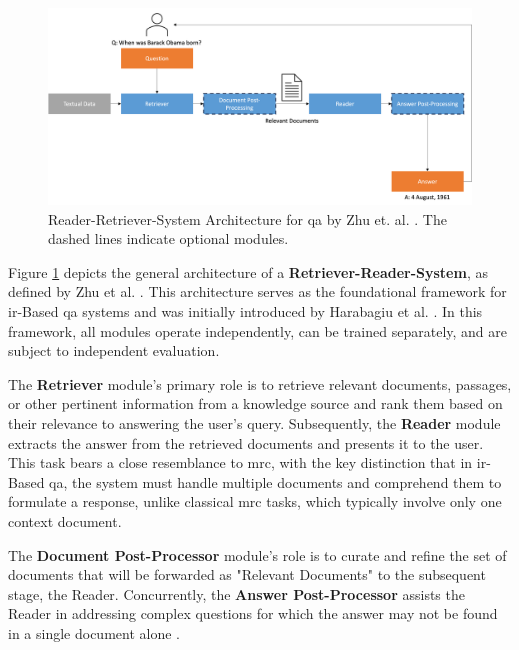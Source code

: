\begin{figure}
    \centering
    \includegraphics[width=\textwidth]{Grafiken/Retriever_Reader.png}
    \caption{Reader-Retriever-System Architecture for \gls{qa} by Zhu et. al. \cite{zhu_retrieving_2021}. The dashed lines indicate optional modules.}
    \label{fig:rr_architecture}
\end{figure}

Figure \ref{fig:rr_architecture} depicts the general architecture of a \textbf{Retriever-Reader-System}, as defined by Zhu et al. \cite{zhu_retrieving_2021}. This architecture serves as the foundational framework for \gls{ir}-Based \gls{qa} systems and was initially introduced by Harabagiu et al. \cite{harabagiu_open-domain_2003}. In this framework, all modules operate independently, can be trained separately, and are subject to independent evaluation.

The \textbf{Retriever} module's primary role is to retrieve relevant documents, passages, or other pertinent information from a knowledge source and rank them based on their relevance to answering the user's query. Subsequently, the \textbf{Reader} module extracts the answer from the retrieved documents and presents it to the user. This task bears a close resemblance to \gls{mrc}, with the key distinction that in \gls{ir}-Based \gls{qa}, the system must handle multiple documents and comprehend them to formulate a response, unlike classical \gls{mrc} tasks, which typically involve only one context document.

The \textbf{Document Post-Processor} module's role is to curate and refine the set of documents that will be forwarded as "Relevant Documents" to the subsequent stage, the Reader. Concurrently, the \textbf{Answer Post-Processor} assists the Reader in addressing complex questions for which the answer may not be found in a single document alone \cite{zhu_retrieving_2021,jurafsky_speech_2023}.

